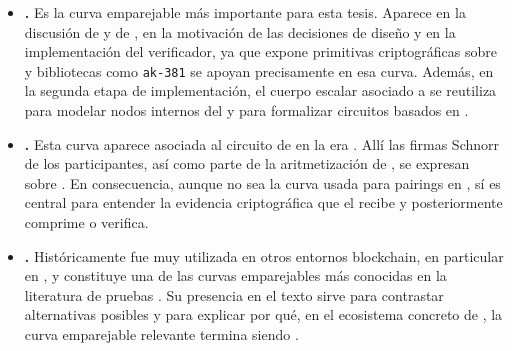 \begin{itemize}[noitemsep]
	\item \textbf{\BLS.} Es la curva emparejable más importante para esta tesis. Aparece en la discusión de \Groth y de \KZG, en la motivación de las decisiones de diseño y en la implementación \Onchain del verificador, ya que \Cardano expone primitivas criptográficas sobre \BLS y bibliotecas como \texttt{ak-381} se apoyan precisamente en esa curva. Además, en la segunda etapa de implementación, el cuerpo escalar asociado a \BLS se reutiliza para modelar nodos internos del \SMT y para formalizar circuitos basados en \PoseidonHash.
	\item \textbf{\Jubjub.} Esta curva aparece asociada al circuito \STM de \Mithril en la era \Lagrange. Allí las firmas Schnorr de los participantes, así como parte de la aritmetización de \HaloTwo, se expresan sobre \Jubjub. En consecuencia, aunque \Jubjub no sea la curva usada para pairings \Onchain en \Cardano, sí es central para entender la evidencia criptográfica que el \zkBridge recibe y posteriormente comprime o verifica.
	\item \textbf{\BN.} Históricamente fue muy utilizada en otros entornos blockchain, en particular en \Ethereum, y constituye una de las curvas emparejables más conocidas en la literatura de pruebas \zkSNARK. Su presencia en el texto sirve para contrastar alternativas posibles y para explicar por qué, en el ecosistema concreto de \Cardano, la curva emparejable relevante termina siendo \BLS.
\end{itemize}
